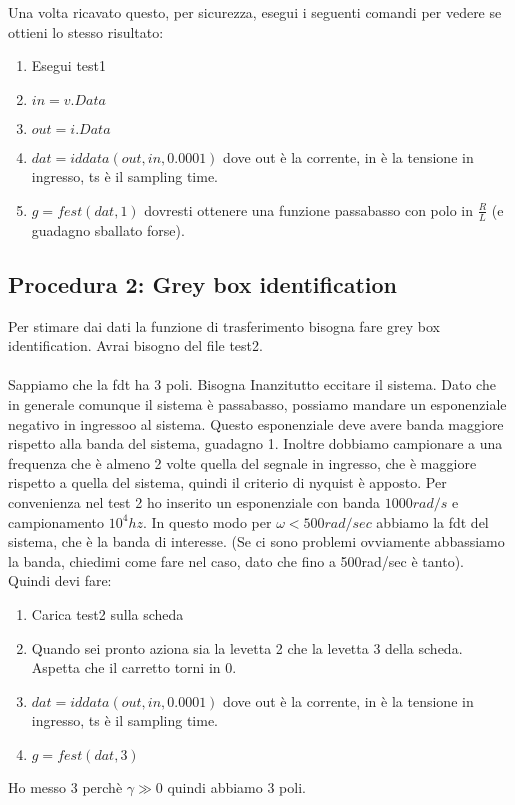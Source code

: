 \documentclass[10pt,a4paper]{article}
\begin{document}
Una volta ricavato questo, per sicurezza,  esegui i seguenti comandi per vedere se ottieni lo stesso risultato:
\begin{enumerate}
\item Esegui test1
\item $in=v.Data$
\item $out = i.Data$
\item $dat = iddata(out,in, 0.0001)$ dove out è la corrente, in è la tensione in ingresso, ts è il sampling time.
\item $g = fest(dat, 1)$ dovresti ottenere una funzione passabasso con polo in $\frac{R}{L}$ (e guadagno sballato forse).
\end{enumerate}

\subsection{Procedura 2: Grey box identification}
Per stimare dai dati la funzione di trasferimento bisogna fare grey box identification. Avrai bisogno del file test2.\\ \\Sappiamo che la fdt ha 3 poli. Bisogna Inanzitutto eccitare il sistema. Dato che in generale comunque il sistema è passabasso, possiamo mandare un esponenziale negativo in ingressoo al sistema. Questo esponenziale deve avere banda maggiore rispetto alla banda del sistema, guadagno 1. Inoltre dobbiamo campionare a una frequenza che è almeno 2 volte quella del segnale in ingresso, che è maggiore rispetto a quella del sistema, quindi il criterio di nyquist è apposto. Per convenienza nel test 2 ho inserito un esponenziale con banda $1000rad/s$ e campionamento $10^4 hz$. In questo modo per $\omega < 500 rad/sec$ abbiamo la fdt del sistema, che è la banda di interesse. (Se ci sono problemi ovviamente abbassiamo la banda, chiedimi come fare nel caso, dato che fino a 500rad/sec è tanto). \\
Quindi devi fare:
\begin{enumerate}
\item Carica test2 sulla scheda
\item Quando sei pronto aziona sia la levetta 2 che la levetta 3 della scheda. Aspetta che il carretto torni in 0.
\item $dat = iddata(out,in, 0.0001)$ dove out è la corrente, in è la tensione in ingresso, ts è il sampling time.
\item $g = fest(dat, 3)$
\end{enumerate}
Ho messo $3$ perchè $\gamma \gg 0$ quindi abbiamo $3$ poli.
\end{document}
